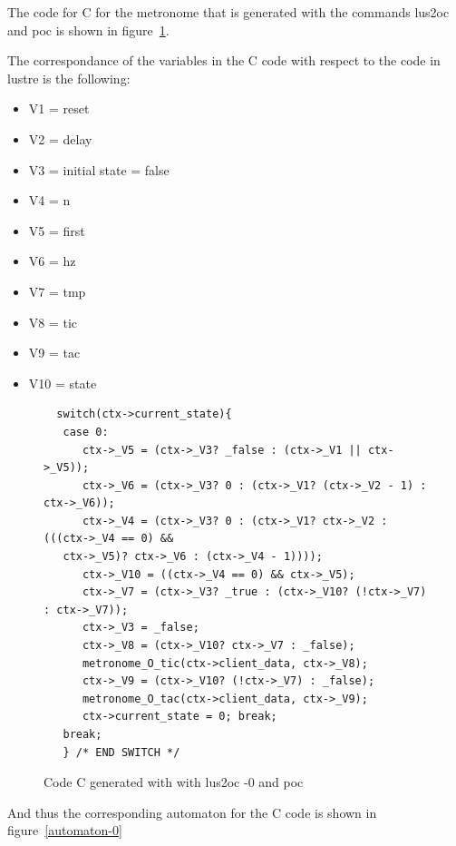 \documentclass{article}
\begin{document}
The code for C for the metronome that is generated with the commands
lus2oc and poc is shown in figure~\ref{metronome-0}.

The correspondance of the variables in the C code with
respect to the code in lustre is the following:

\begin{itemize}
\item V1 = reset
\item V2 = delay
\item V3 = initial state = false
\item V4 = n              
\item V5 = first         
\item V6 = hz
\item V7 = tmp               
\item V8 = tic  
\item V9 = tac
\item V10 = state
\end{itemize}


\begin{figure}[ht]

\begin{verbatim}
  switch(ctx->current_state){
   case 0:
      ctx->_V5 = (ctx->_V3? _false : (ctx->_V1 || ctx->_V5));
      ctx->_V6 = (ctx->_V3? 0 : (ctx->_V1? (ctx->_V2 - 1) : ctx->_V6));
      ctx->_V4 = (ctx->_V3? 0 : (ctx->_V1? ctx->_V2 : (((ctx->_V4 == 0) &&
   ctx->_V5)? ctx->_V6 : (ctx->_V4 - 1))));
      ctx->_V10 = ((ctx->_V4 == 0) && ctx->_V5);
      ctx->_V7 = (ctx->_V3? _true : (ctx->_V10? (!ctx->_V7) : ctx->_V7));
      ctx->_V3 = _false;
      ctx->_V8 = (ctx->_V10? ctx->_V7 : _false);
      metronome_O_tic(ctx->client_data, ctx->_V8);
      ctx->_V9 = (ctx->_V10? (!ctx->_V7) : _false);
      metronome_O_tac(ctx->client_data, ctx->_V9);
      ctx->current_state = 0; break;
   break;
   } /* END SWITCH */
\end{verbatim}
\label{metronome-0}
\caption{Code C generated with with lus2oc -0 and poc}
\end{figure}


And thus the corresponding automaton for the C code is shown
in figure~\ref{automaton-0}
\end{document}
